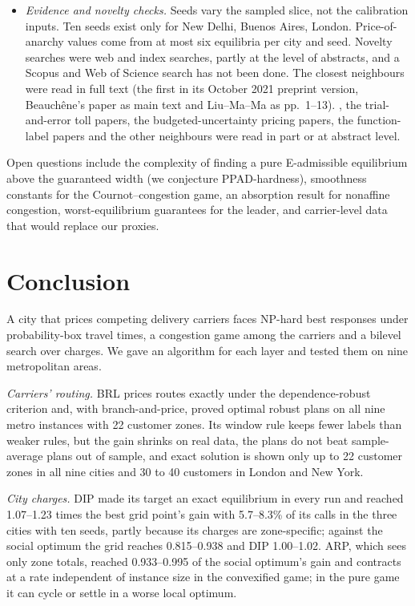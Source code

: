 \documentclass[preprint,11pt]{elsarticle}
\theoremstyle{definition}
\theoremstyle{remark}
\begin{document}
\begin{itemize}[leftmargin=*,itemsep=0pt]
\item \emph{Evidence and novelty checks.} Seeds vary the sampled slice, not the calibration inputs. Ten seeds exist only for New Delhi, Buenos Aires, London. Price-of-anarchy values come from at most six equilibria per city and seed. Novelty searches were web and index searches, partly at the level of abstracts, and a Scopus and Web of Science search has not been done. The closest neighbours \citep{GhosalHoWiesemann2024,Masiha2026,Feik2026,Beauchene2016,LiuMaMa2026,Irnich2008} were read in full text (the first in its October 2021 preprint version, Beauch\^ene's paper as main text and Liu--Ma--Ma as pp.\ 1--13). \citet{Lanzetti2025}, the trial-and-error toll papers, the budgeted-uncertainty pricing papers, the function-label papers \citep{Dabia2013,Ioachim1998} and the other neighbours were read in part or at abstract level.
\end{itemize}
Open questions include the complexity of finding a pure E-admissible equilibrium above the guaranteed width (we conjecture PPAD-hardness), smoothness constants for the Cournot--congestion game, an absorption result for nonaffine congestion, worst-equilibrium guarantees for the leader, and carrier-level data that would replace our proxies.

\section{Conclusion}\label{sec:conclusion}

A city that prices competing delivery carriers faces NP-hard best responses under probability-box travel times, a congestion game among the carriers and a bilevel search over charges. We gave an algorithm for each layer and tested them on nine metropolitan areas.

\emph{Carriers' routing.} BRL prices routes exactly under the dependence-robust criterion and, with branch-and-price, proved optimal robust plans on all nine metro instances with 22 customer zones. Its window rule keeps fewer labels than weaker rules, but the gain shrinks on real data, the plans do not beat sample-average plans out of sample, and exact solution is shown only up to 22 customer zones in all nine cities and 30 to 40 customers in London and New York.

\emph{City charges.} DIP made its target an exact equilibrium in every run and reached 1.07--1.23 times the best grid point's gain with 5.7--8.3\% of its calls in the three cities with ten seeds, partly because its charges are zone-specific; against the social optimum the grid reaches 0.815--0.938 and DIP 1.00--1.02. ARP, which sees only zone totals, reached 0.933--0.995 of the social optimum's gain and contracts at a rate independent of instance size in the convexified game; in the pure game it can cycle or settle in a worse local optimum.
\end{document}
